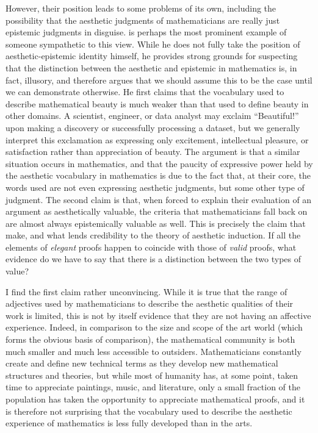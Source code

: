 \documentclass[a4paper,man,natbib]{apa6}
\begin{document}
However, their position leads to some problems of its own, including the possibility that the aesthetic
judgments of mathematicians are really just epistemic judgments in disguise. \cite{todd_unmasking_2008} is perhaps
the most prominent example of someone sympathetic to this view. While he does not fully take the position  of 
aesthetic-epistemic identity himself, he provides strong grounds for suspecting that the distinction between the 
aesthetic and epistemic in mathematics is, in fact, illusory, and therefore argues that we should assume this to be 
the case until we can demonstrate otherwise. He first  claims that the vocabulary used to
describe mathematical beauty is much weaker than that used to define beauty in other domains. A scientist, engineer,
or data analyst may exclaim ``Beautiful!'' upon making a discovery or successfully processing a dataset, but we generally
interpret this exclamation as expressing only excitement, intellectual pleasure, or satisfaction rather than appreciation
of beauty. The argument is that a similar situation occurs in mathematics, and that the paucity of expressive power held
by the aesthetic vocabulary in mathematics is due to the fact that, at their core, the words used are not even expressing 
aesthetic judgments, but some other type of judgment. The second claim is that, when forced to explain their evaluation 
of an argument as aesthetically valuable, the criteria that mathematicians fall back on are almost always epistemically 
valuable as well. This is precisely the claim that \cite{mcallister_mathematical_2005} make, and what lends credibility
to the theory of aesthetic induction. If all the elements of \textit{elegant} proofs happen to coincide with those of 
\textit{valid} proofs, what evidence do we have to say that there is a distinction between the two types of value?

I find the first claim rather unconvincing. While it is true that the range of adjectives used by mathematicians to describe
the aesthetic qualities of their work is limited, this is not by itself evidence that they are not having an affective
experience. Indeed, in comparison to the size and scope of the art world (which forms the obvious basis of comparison),
the mathematical community is both much smaller and much less accessible to outsiders. Mathematicians constantly create 
and define new technical terms as they develop new mathematical structures and theories, but while most of humanity has,
at some point, taken time to appreciate paintings, music, and literature, only a small fraction of the population has 
taken the opportunity to appreciate mathematical proofs, and it is therefore not surprising that the vocabulary used 
to describe the aesthetic experience of mathematics is less fully developed than in the arts.
\end{document}

